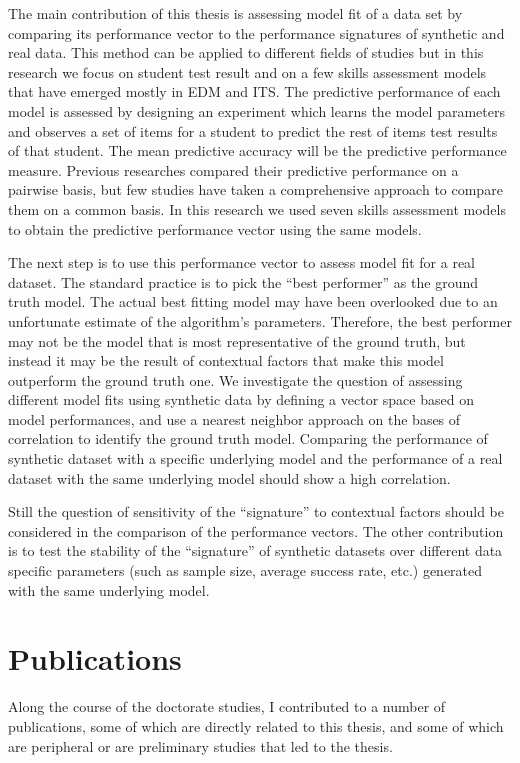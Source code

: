 The main contribution of this thesis is assessing model fit of a data set by comparing its performance vector to the performance signatures of synthetic and real data. This method can be applied to different fields of studies but in this research we focus on student test result and on a few skills assessment models that have emerged mostly in EDM and ITS. The predictive performance of each model is assessed by designing an experiment which learns the model parameters and observes a set of items for a student to predict the rest of items test results of that student. The mean predictive accuracy will be the predictive performance measure. Previous researches compared their predictive performance  on a pairwise basis, but few studies have taken a comprehensive approach to compare them on a common basis. In this research we used seven skills assessment models to obtain the predictive performance vector using the same models. 

The next step is to use this performance vector to assess model fit for a real dataset. The standard practice is to pick the ``best performer'' as the ground truth model. The actual best fitting model may have been overlooked due to an unfortunate estimate of the algorithm's parameters.  Therefore, the best performer may not be the model that is most representative of the ground truth, but instead it may be the result of contextual factors that make this model outperform the ground truth one. We investigate the question of assessing different model fits using synthetic data by defining a vector space based on model performances, and use a nearest neighbor approach on the bases of correlation to identify the ground truth model. Comparing the performance of synthetic dataset with a specific underlying model and the performance of a real dataset with the same underlying model should show a high correlation. 

Still the question of sensitivity of the ``signature'' to contextual factors should be considered in the comparison of the performance vectors. The other contribution is to test the stability of the ``signature'' of synthetic datasets over different data specific parameters (such as sample size, average success rate, etc.) generated with the same underlying model. 


\section{Publications}

Along the course of the doctorate studies, I contributed to a number of publications, some of which are directly related to this thesis, and some of which are peripheral or are preliminary studies that led to the thesis.

